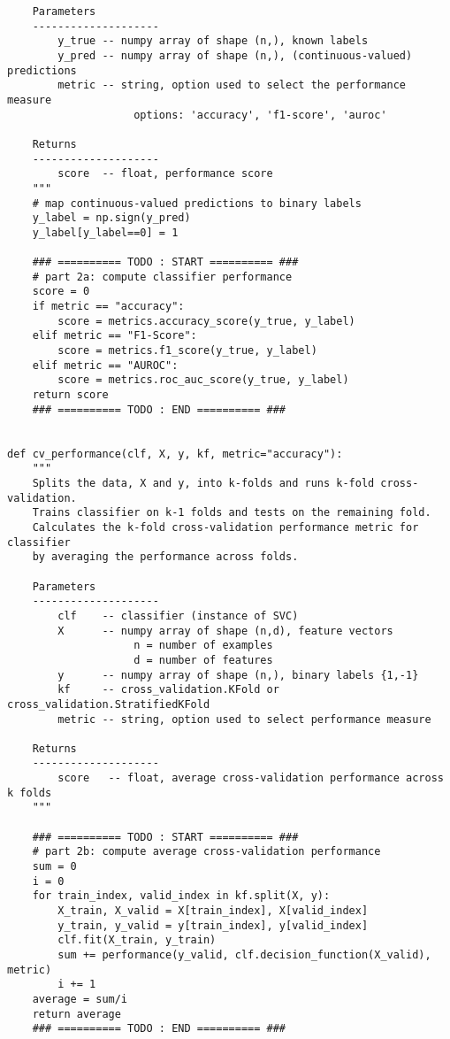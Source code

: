 \documentclass[11pt]{article}
\begin{document}
\begin{verbatim}
    Parameters
    --------------------
        y_true -- numpy array of shape (n,), known labels
        y_pred -- numpy array of shape (n,), (continuous-valued) predictions
        metric -- string, option used to select the performance measure
                    options: 'accuracy', 'f1-score', 'auroc'       
    
    Returns
    --------------------
        score  -- float, performance score
    """
    # map continuous-valued predictions to binary labels
    y_label = np.sign(y_pred)
    y_label[y_label==0] = 1
    
    ### ========== TODO : START ========== ###
    # part 2a: compute classifier performance
    score = 0
    if metric == "accuracy":
        score = metrics.accuracy_score(y_true, y_label)
    elif metric == "F1-Score":
        score = metrics.f1_score(y_true, y_label)
    elif metric == "AUROC":
        score = metrics.roc_auc_score(y_true, y_label)
    return score
    ### ========== TODO : END ========== ###


def cv_performance(clf, X, y, kf, metric="accuracy"):
    """
    Splits the data, X and y, into k-folds and runs k-fold cross-validation.
    Trains classifier on k-1 folds and tests on the remaining fold.
    Calculates the k-fold cross-validation performance metric for classifier
    by averaging the performance across folds.
    
    Parameters
    --------------------
        clf    -- classifier (instance of SVC)
        X      -- numpy array of shape (n,d), feature vectors
                    n = number of examples
                    d = number of features
        y      -- numpy array of shape (n,), binary labels {1,-1}
        kf     -- cross_validation.KFold or cross_validation.StratifiedKFold
        metric -- string, option used to select performance measure
    
    Returns
    --------------------
        score   -- float, average cross-validation performance across k folds
    """
    
    ### ========== TODO : START ========== ###
    # part 2b: compute average cross-validation performance
    sum = 0
    i = 0   
    for train_index, valid_index in kf.split(X, y):
        X_train, X_valid = X[train_index], X[valid_index]
        y_train, y_valid = y[train_index], y[valid_index]
        clf.fit(X_train, y_train)
        sum += performance(y_valid, clf.decision_function(X_valid), metric)
        i += 1
    average = sum/i
    return average 
    ### ========== TODO : END ========== ###



\end{verbatim}
\end{document}
